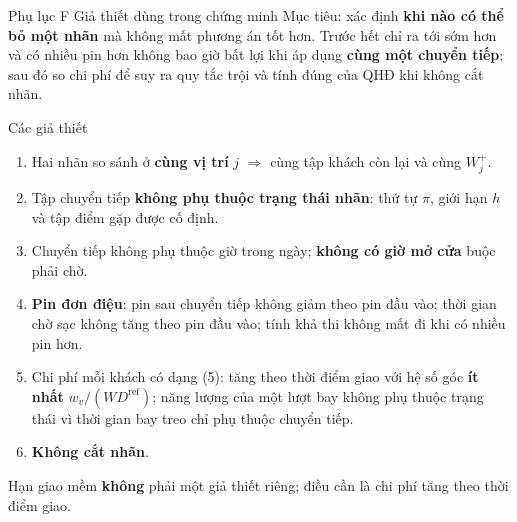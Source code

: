 \documentclass[aspectratio=169,10pt,t,xcolor={table}]{beamer}
\newcommand{\Dref}{D^{\mathrm{ref}}}
\newcommand{\apptitle}[2]{Phụ lục #1 \textperiodcentered{} #2}
\begin{document}
\begin{frame}[label=appF]{\apptitle{F}{Giả thiết dùng trong chứng minh}}
\footnotesize Mục tiêu: xác định \textbf{khi nào có thể bỏ một nhãn} mà không mất phương án tốt hơn. Trước hết chỉ ra tới sớm hơn và có nhiều pin hơn không bao giờ bất lợi khi áp dụng \textbf{cùng một chuyển tiếp}; sau đó so chi phí để suy ra quy tắc trội và tính đúng của QHĐ khi không cắt nhãn.
\vspace{4pt}
\begin{block}{Các giả thiết}
\scriptsize
\begin{enumerate}
\item[(i)] Hai nhãn so sánh ở \textbf{cùng vị trí} $j$ $\Rightarrow$ cùng tập khách còn lại và cùng $W^+_j$.
\item[(ii)] Tập chuyển tiếp \textbf{không phụ thuộc trạng thái nhãn}: thứ tự $\pi$, giới hạn $h$ và tập điểm gặp được cố định.
\item[(iii)] Chuyển tiếp không phụ thuộc giờ trong ngày; \textbf{không có giờ mở cửa} buộc phải chờ.
\item[(iv)] \textbf{Pin đơn điệu}: pin sau chuyển tiếp không giảm theo pin đầu vào; thời gian chờ sạc không tăng theo pin đầu vào; tính khả thi không mất đi khi có nhiều pin hơn.
\item[(v)] Chi phí mỗi khách có dạng (5): tăng theo thời điểm giao với hệ số góc \textbf{ít nhất} $w_v/(W\Dref)$; năng lượng của một lượt bay không phụ thuộc trạng thái vì thời gian bay treo chỉ phụ thuộc chuyển tiếp.
\item[(vi)] \textbf{Không cắt nhãn}.
\end{enumerate}
Hạn giao mềm \textbf{không} phải một giả thiết riêng; điều cần là chi phí tăng theo thời điểm giao.
\end{block}
\end{frame}
\end{document}
